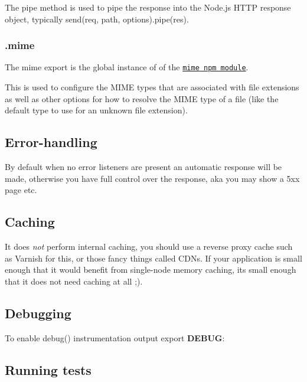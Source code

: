 The {\ttfamily pipe} method is used to pipe the response into the Node.\+js H\+T\+TP response object, typically {\ttfamily send(req, path, options).pipe(res)}.

\subsubsection*{.mime}

The {\ttfamily mime} export is the global instance of of the \href{https://www.npmjs.com/package/mime}{\tt {\ttfamily mime} npm module}.

This is used to configure the M\+I\+ME types that are associated with file extensions as well as other options for how to resolve the M\+I\+ME type of a file (like the default type to use for an unknown file extension).

\subsection*{Error-\/handling}

By default when no {\ttfamily error} listeners are present an automatic response will be made, otherwise you have full control over the response, aka you may show a 5xx page etc.

\subsection*{Caching}

It does {\itshape not} perform internal caching, you should use a reverse proxy cache such as Varnish for this, or those fancy things called C\+D\+Ns. If your application is small enough that it would benefit from single-\/node memory caching, it\textquotesingle{}s small enough that it does not need caching at all ;).

\subsection*{Debugging}

To enable {\ttfamily debug()} instrumentation output export {\bfseries D\+E\+B\+UG}\+:




\subsection*{Running tests}


